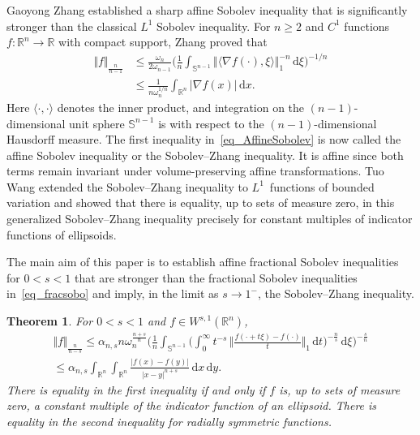 \documentclass{amsart}
\newtheorem{theorem}{Theorem}
\newcommand{\snvtex}{{\mathbb S}^{n-1}}
\newcommand{\dvtex}{\,\mathrm{d}}
\begin{document}
Gaoyong Zhang \cite{Zhang99} established a sharp affine Sobolev inequality
that is significantly stronger than the classical $L^{1}$ Sobolev inequality.
For $n\ge 2$ and $C^{1}$ functions $f: \mathbb R^{n}\to \mathbb R$ with
compact support, Zhang \cite{Zhang99} proved that
%
\begin{equation}
\label{eq_AffineSobolev}
%
\begin{split}
\Vert f\Vert _{{\frac {n}{n-1}}}
&\le \frac{ \omega _{n}}{ 2 \omega _{n-1}} \Big(\frac{1}{n} \int _{\snvtex} \Vert \langle \nabla f(\cdot ),\xi \rangle \Vert _{1}^{-n} \dvtex \xi \Big)^{-1/n}
\\
&\le \frac {1}{n\omega _{n}^{1/n}}\int _{\mathbb R^{n}} \vert \nabla f(x) \vert \dvtex x.
\end{split}
%
\end{equation}
%
Here $\langle \cdot ,\cdot \rangle $ denotes the inner product, and integration
on the $(n-1)$-dimensional unit sphere $\snvtex $ is with respect to the
$(n-1)$-dimensional Hausdorff measure. The first inequality in~\eqref{eq_AffineSobolev} is now called the affine Sobolev inequality or
the Sobolev--Zhang inequality. It is affine since both terms remain invariant
under volume-preserving affine transformations. Tuo Wang
\cite{Tuo_Wang} extended the Sobolev--Zhang inequality to $L^{1}$~functions
of bounded variation and showed that there is equality, up to sets of measure
zero, in this generalized Sobolev--Zhang inequality precisely for constant
multiples of indicator functions of ellipsoids.

The main aim of this paper is to establish affine fractional Sobolev inequalities
for $0<s<1$ that are stronger than the fractional Sobolev inequalities
in~\eqref{eq_fracsobo} and imply, in the limit as $s\to 1^{-}$, the Sobolev--Zhang
inequality.

\begin{theorem}%
\label{thm_afracsobo}
For $0<s<1$ and $f\in W^{s,1}(\mathbb R^{n})$,
%
\begin{multline}
\Vert f\Vert _{{\frac {n}{n-s}}}
\le \alpha _{n,s} n \omega _{n}^{\frac{n+s}{n}}\Big(
\frac {1}{n}\int _{\snvtex}\Big( \int _{0}^{\infty }t^{-s}\, \Big\Vert
\frac{f(\cdot +t\xi )-f(\cdot )}{t}\Big\Vert _{1}\dvtex t\Big)^{-
\frac {n} {s}}\dvtex \xi \Big)^{- \frac {s} {n}}
\\
\le \alpha _{n,s}\int _{\mathbb R^{n}} \int _{\mathbb R^{n}}
\frac{\vert f(x)-f(y)\vert}{\vert x-y \vert ^{n+s}}\dvtex x\dvtex y.
\nonumber \end{multline}
%
There is equality in the first inequality if and only if $f$ is, up to
sets of measure zero, a constant multiple of the indicator function of
an ellipsoid. There is equality in the second inequality for radially symmetric
functions.
\end{theorem}
\end{document}
